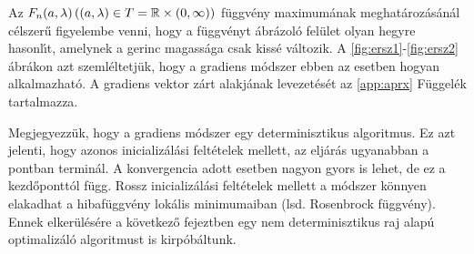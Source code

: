 \documentclass[oneside,titlepage,12pt,a4paper]{report}
\begin{document}
Az $F_n(a,\lambda) \, ((a,\lambda)\in T=\Bbb R\times (0,\infty))$ f\"uggv\'eny maximum\'anak  meghat\'aroz\'as\'an\'al c\'elszerű figyelembe venni, hogy a f\"uggv\'enyt \'abr\'azol\'o fel\"ulet olyan hegyre hasonl\'\i t, amelynek a gerinc magass\'aga csak kiss\'e v\'altozik. A \ref{fig:ersz1}-\ref{fig:ersz2} \'abr\'akon azt szeml\'eltet\-j\"uk, hogy a gradiens m\'odszer ebben az esetben hogyan alkalmazhat\'o. A gradiens vektor zárt alakjának levezetését az \ref{app:aprx} Függelék tartalmazza.

Megjegyezzük, hogy a gradiens módszer egy determinisztikus algoritmus. Ez azt jelenti, hogy azonos inicializálási feltételek mellett, az eljárás ugyanabban a pontban terminál. A konvergencia adott esetben nagyon gyors is lehet, de ez a kezdőponttól függ. Rossz inicializálási feltételek mellett a módszer könnyen elakadhat a hibafüggvény lokális minimumaiban (lsd. Rosenbrock függvény). Ennek elkerülésére a következő fejeztben egy nem determinisztikus raj alapú optimalizáló algoritmust is kirpóbáltunk.
\end{document}
